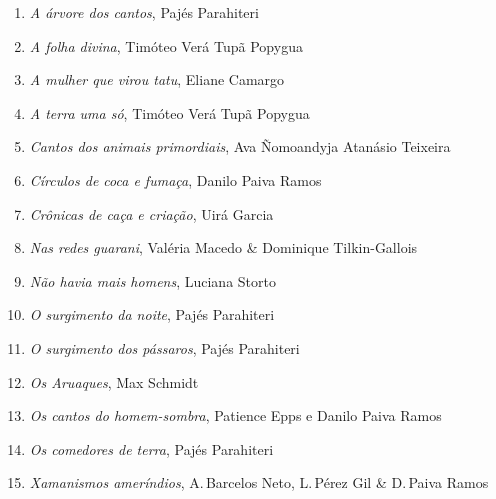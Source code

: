 


\begin{enumerate}
\setlength{\topsep}{2pt}
\setlength{\partopsep}{0pt}
\setlength\parskip{4.2pt}
\setlength\itemsep{-1.4mm}
\item \textit{A árvore dos cantos}, Pajés Parahiteri
\item \textit{A folha divina}, Timóteo Verá Tupã Popygua
\item \textit{A mulher que virou tatu}, Eliane Camargo
\item \textit{A terra uma só}, Timóteo Verá Tupã Popygua
\item \textit{Cantos dos animais primordiais}, Ava Ñomoandyja Atanásio Teixeira
\item \textit{Círculos de coca e fumaça}, Danilo Paiva Ramos
\item \textit{Crônicas de caça e criação}, Uirá Garcia
\item \textit{Nas redes guarani}, Valéria Macedo \& Dominique Tilkin-Gallois
\item \textit{Não havia mais homens}, Luciana Storto
\item \textit{O surgimento da noite}, Pajés Parahiteri
\item \textit{O surgimento dos pássaros}, Pajés Parahiteri
\item \textit{Os Aruaques}, Max Schmidt
\item \textit{Os cantos do homem-sombra}, Patience Epps e Danilo Paiva Ramos
\item \textit{Os comedores de terra}, Pajés Parahiteri
\item \textit{Xamanismos ameríndios}, A.\,Barcelos Neto, L.\,Pérez Gil \& D.\,Paiva Ramos
\end{enumerate}



